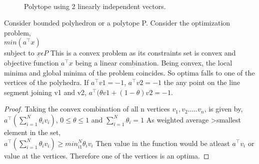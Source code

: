 \documentclass{tufte-handout}
\theoremstyle{remark}
\renewcommand{\vec}[1]{\underline{#1}}
\begin{document}
\begin{figure}
    \centering
{}\\
\caption{Polytope using 2 linearly independent vectors.}
\end{figure}
Consider  bounded polyhedron or a polytope P. Consider the optimization problem,\\
$min(a^\top x) $\\
subject to $ \vec{x} \epsilon P$
This is a convex problem as its constraints set is convex and objective function $a^\top x$ being a linear combination. Being convex, the local minima and global minima of the problem coincides. So optima falls to one of the vertices of the polyhedra. If  $a^\top v1=-1$, $a^\top v2=-1$ the any point on the line segment joining v1 and v2, $a^\top (\theta v1+(1-\theta)v2=-1$.
\begin{proof}
Taking the convex combination of all n vertices $v_1,v_2.....v_n$, is given by,\\
$a^\top(\sum_{i=1}^N \theta_i v_i)$, $0 \le \theta \le 1  $ and $\sum_{i=1}^N \theta_i=1$
As weighted average >smallest element in the set,\\
$a^\top(\sum_{i=1}^N \theta_i v_i) \ge min_{i1}^N\theta_i v_i$
Then value in the function would be atleast $a^\top v_i$ or value at the vertices. Therefore one of the vertices is an optima.
\end{proof}
\end{document}
